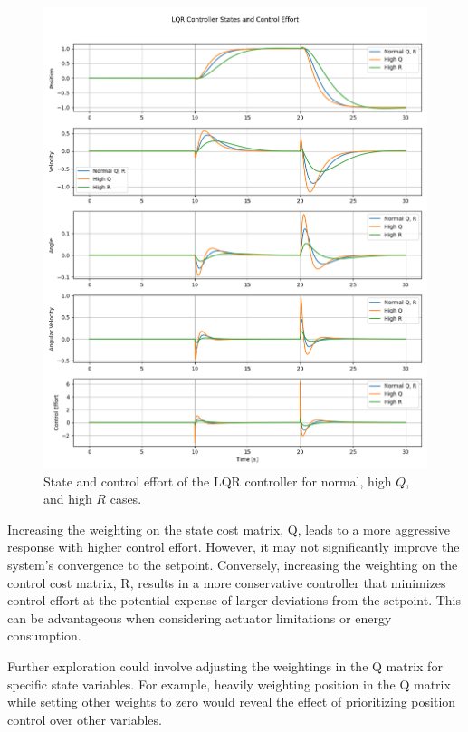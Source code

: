 \documentclass[11pt,twocolumn,twoside,lineno]{pnas-new}
\begin{document}
\begin{figure}[h]
\centering
\includegraphics[width=\linewidth]{simulations/lqr_controller.png}
\caption{State and control effort of the LQR controller for normal, high $Q$, and high $R$ cases.}
\end{figure}

Increasing the weighting on the state cost matrix, Q, leads to a more aggressive response with higher control effort. However, it may not significantly improve the system's convergence to the setpoint. Conversely, increasing the weighting on the control cost matrix, R, results in a more conservative controller that minimizes control effort at the potential expense of larger deviations from the setpoint. This can be advantageous when considering actuator limitations or energy consumption.

Further exploration could involve adjusting the weightings in the Q matrix for specific state variables. For example, heavily weighting position in the Q matrix while setting other weights to zero would reveal the effect of prioritizing position control over other variables.
\end{document}
